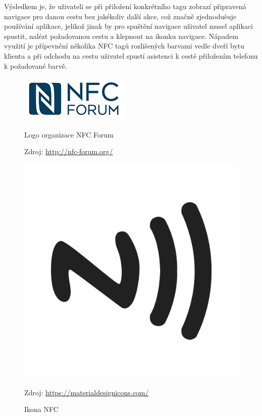 \documentclass{article}
\begin{document}
Výsledkem je, že uživateli se při přiložení konkrétního tagu zobrazí připravená navigace pro danou
cestu bez jakékoliv další akce, což značně zjednodušuje používání aplikace, jelikož jinak by pro spuštění navigace
uživatel musel aplikaci spustit, nalézt požadovanou cestu a klepnout na ikonku navigace. Nápadem
 využití je přípevnění několika NFC tagů rozlišených barvami vedle dveří bytu klienta a při odchodu na
 cestu uživatel spustí asistenci k cestě přiložením telefonu k požadované barvě.

\begin{figure}[H]
\begin{minipage}{.5\textwidth}
\centering
                \includegraphics[scale=0.4]{img/nfc-forum-logo.png}
        \caption{Logo organizace NFC Forum}
        \label{fig:nfcforumlogo}
        \centering Zdroj: \url{http://nfc-forum.org/}
\end{minipage}
\begin{minipage}{.5\textwidth}
\centering
                \includegraphics[scale=0.07]{img/nfc-icon.png}
        \caption{Ikona NFC}
        \centering Zdroj: \url{https://materialdesignicons.com/}
        \label{fig:nfcicon}
    \end{minipage}
\end{figure}
\end{document}
